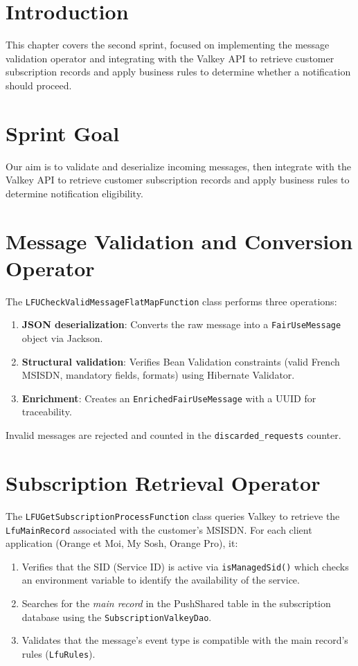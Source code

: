 
\section{Introduction}
This chapter covers the second sprint, focused on implementing the message validation operator and integrating with the Valkey API to retrieve customer subscription records and apply business rules to determine whether a notification should proceed.

\section{Sprint Goal}

Our aim is to validate and deserialize incoming messages, then integrate with the Valkey API to retrieve customer subscription records and apply business rules to determine notification eligibility.

\section{Message Validation and Conversion Operator}

The \texttt{LFUCheckValidMessageFlatMapFunction} class performs three operations:
\begin{enumerate}
    \item \textbf{JSON deserialization}: Converts the raw message into a \texttt{FairUseMessage} object via Jackson.
    \item \textbf{Structural validation}: Verifies Bean Validation constraints (valid French MSISDN, mandatory fields, formats) using Hibernate Validator.
    \item \textbf{Enrichment}: Creates an \texttt{EnrichedFairUseMessage} with a UUID for traceability.
\end{enumerate}

Invalid messages are rejected and counted in the \texttt{discarded\_requests} counter.

\section{Subscription Retrieval Operator}

The \texttt{LFUGetSubscriptionProcessFunction} class queries Valkey to retrieve the \texttt{LfuMainRecord} associated with the customer's MSISDN. For each client application (Orange et Moi, My Sosh, Orange Pro), it:
\begin{enumerate}
    \item Verifies that the SID (Service ID) is active via \texttt{isManagedSid()} which checks an environment variable to identify the availability of the service.
    \item Searches for the \textit{main record} in the PushShared table in the subscription database using the \texttt{SubscriptionValkeyDao}.
    \item Validates that the message's event type is compatible with the main record's rules (\texttt{LfuRules}).
\end{enumerate}

